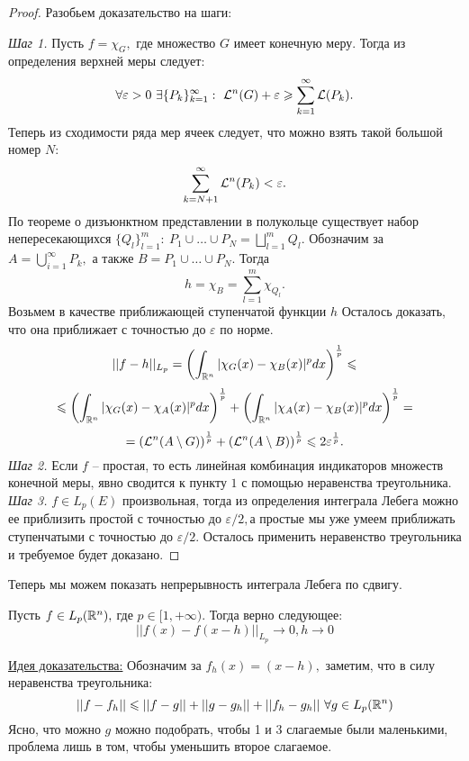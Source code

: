 \begin{proof} Разобьем доказательство на шаги:

\textit{Шаг 1.} Пусть $f = \chi_{G},$ где множество $G$ имеет конечную меру. Тогда из определения верхней меры следует:
    $$\forall \varepsilon > 0 \ \exists \{P_{k}\}_{k = 1}^{\infty} : \ \mathcal{L}^n(G) + \varepsilon \geqslant \sum_{k  =1}^{\infty}\mathcal{L}(P_k).$$
    Теперь из сходимости ряда мер ячеек следует, что можно взять такой большой номер $N:$
    $$\sum_{k = N + 1}^{\infty} \mathcal{L}^n(P_k) < \varepsilon.$$
    По теореме о дизъюнктном представлении в полукольце существует набор непересекающихся $\{Q_l\}_{l = 1}^{m}: \ P_1 \cup \ldots \cup P_N = \bigsqcup_{l = 1}^mQ_l.$ Обозначим за $A = \bigcup_{i = 1}^{\infty} P_k, \text{ а также } B = P_1 \cup \ldots \cup P_N.$ Тогда
    $$h = \chi_B= \sum_{l = 1}^{m}\chi_{Q_l}.$$
    Возьмем в качестве приближающей ступенчатой функции $h$ Осталось доказать, что она приближает с точностью до $\varepsilon$ по норме.
    $$||f - h||_{L_p} = \left( \int_{\mathbb{R}^n} |\chi_G(x) - \chi_B(x)|^p dx\right)^{\frac{1}{p}} \leqslant$$
    $$\leqslant \left( \int_{\mathbb{R}^n} |\chi_G(x) - \chi_A(x)|^p dx\right)^{\frac{1}{p}} + \left( \int_{\mathbb{R}^n} |\chi_A(x) - \chi_B(x)|^p dx\right)^{\frac{1}{p}} = $$
    $$= \left( \mathcal{L}^n(A \setminus G)\right)^{\frac{1}{p}} + \left( \mathcal{L}^n(A \setminus B) \right)^{\frac{1}{p}} \leqslant 2\varepsilon^{\frac{1}{p}}.$$
\textit{Шаг 2.} Если $f$ -- простая, то есть линейная комбинация индикаторов множеств конечной меры, явно сводится к пункту $1$ с помощью неравенства треугольника.\\   
\textit{Шаг 3.} $f \in L_p(E)$ произвольная, тогда из определения интеграла Лебега можно ее приблизить простой с точностью до $\varepsilon / 2, $а простые мы уже умеем приближать ступенчатыми с точностью до $\varepsilon / 2.$ Осталось применить неравенство треугольника и требуемое будет доказано.
\end{proof}

Теперь мы можем показать непрерывность интеграла Лебега по сдвигу.
\begin{theorem}
    Пусть $f \in L_p(\mathbb{R}^n), $ где $p \in [1, +\infty).$ Тогда верно следующее:
    $$||f(x) - f(x - h)||_{L_p} \rightarrow 0, h \rightarrow 0$$
\end{theorem}

\underline{Идея доказательства:} Обозначим за $f_h(x) = (x - h),$ заметим, что в силу неравенства треугольника:
$$||f - f_h|| \leqslant ||f - g|| + ||g - g_h|| + ||f_h - g_h|| \ \forall g \in L_p(\mathbb{R}^n)$$
Ясно, что можно $g$ можно подобрать, чтобы 1 и 3 слагаемые были маленькими, проблема лишь в том, чтобы уменьшить второе слагаемое.

